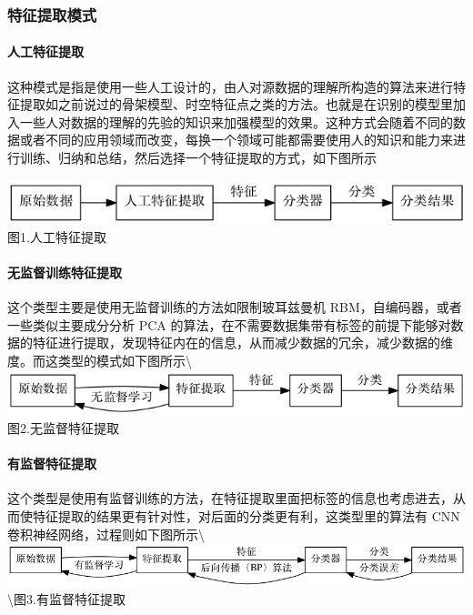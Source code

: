\subsubsection{特征提取模式}\label{ux7279ux5f81ux63d0ux53d6ux6a21ux5f0f}

\paragraph{人工特征提取}\label{ux4ebaux5de5ux7279ux5f81ux63d0ux53d6}

这种模式是指是使用一些人工设计的，由人对源数据的理解所构造的算法来进行特征提取如之前说过的骨架模型、时空特征点之类的方法。也就是在识别的模型里加入一些人对数据的理解的先验的知识来加强模型的效果。这种方式会随着不同的数据或者不同的应用领域而改变，每换一个领域可能都需要使用人的知识和能力来进行训练、归纳和总结，然后选择一个特征提取的方式，如下图所示

\includegraphics{picture/learning-framework1.png} 图1.人工特征提取

\paragraph{无监督训练特征提取}\label{ux65e0ux76d1ux7763ux8badux7ec3ux7279ux5f81ux63d0ux53d6}

这个类型主要是使用无监督训练的方法如限制玻耳兹曼机
RBM，自编码器，或者一些类似主要成分分析 PCA
的算法，在不需要数据集带有标签的前提下能够对数据的特征进行提取，发现特征内在的信息，从而减少数据的冗余，减少数据的维度。而这类型的模式如下图所示\textbackslash{}\includegraphics{picture/learning-framework2.png}
图2.无监督特征提取

\paragraph{有监督特征提取}\label{ux6709ux76d1ux7763ux7279ux5f81ux63d0ux53d6}

这个类型是使用有监督训练的方法，在特征提取里面把标签的信息也考虑进去，从而使特征提取的结果更有针对性，对后面的分类更有利，这类型里的算法有
CNN
卷积神经网络，过程则如下图所示\textbackslash{}\includegraphics{picture/learning-framework3.png}\textbackslash{}图3.有监督特征提取

